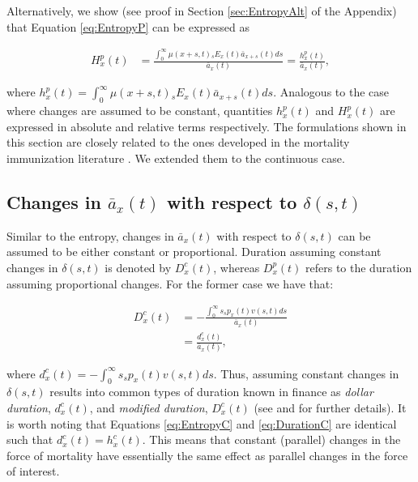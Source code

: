 \documentclass[12pt]{article}
\begin{document}
Alternatively, we show (see proof in Section \ref{sec:EntropyAlt} of the Appendix) that Equation \ref{eq:EntropyP} can be expressed as

\begin{equation} \label{eq:EntropyP2}
\begin{split}
{H}^{p}_{x}(t) &=  \frac{\int_0^\infty \mu(x+s,t)   {}_sE_x(t) \bar{a}_{x+s}(t) ds}{\bar{a}_x(t)} =  \frac{{h}^{p}_{x}(t)}{\bar{a}_x(t)}, 
\end{split}
\end{equation}

where ${h}^{p}_{x}(t)=\int_0^\infty \mu(x+s,t)   {}_sE_x(t) \bar{a}_{x+s}(t) ds$. Analogous to the case where changes are assumed to be constant, quantities ${h}^{p}_{x}(t)$ and ${H}^{p}_{x}(t)$ are expressed in absolute and relative terms respectively. The formulations shown in this section are closely related to the ones developed in the mortality immunization literature \citep{Tsai2013a,Lin2020}. We extended them to the continuous case.

 
 

\subsection{Changes in $\bar{a}_x(t)$ with respect to $\delta(s,t)$}

 Similar to the entropy, changes in $\bar{a}_x(t)$ with respect to $\delta(s,t)$ can be assumed to be either constant or proportional. Duration assuming constant changes in $\delta(s,t)$ is denoted by ${D}^{c}_{x}(t)$, whereas ${D}^{p}_{x}(t)$ refers to the duration assuming proportional changes. For the former case we have that:



\begin{equation}\label{eq:DurationC}
\begin{split}
{D}^{c}_x(t)&= -\frac{\int_0^\infty s {}_sp_x(t) {v}(s,t)ds}{\bar{a}_x(t)} \\
&= \frac{{d}^{c}_x(t)}{\bar{a}_x(t)},
\end{split}
\end{equation}

where ${d}^{c}_x(t)=-\int_0^\infty s {}_sp_x(t) {v}(s,t)ds$. Thus, assuming constant changes in $\delta(s,t)$ results into common types of duration known in finance as \textit{dollar duration}, ${d}^{c}_x(t)$, and \textit{modified duration}, ${D}^{c}_x(t)$ (see \citet{Milevsky2012} and \citet{Tsai2013a} for further details). It is worth noting that Equations \ref{eq:EntropyC} and \ref{eq:DurationC} are identical such that ${d}^{c}_x(t)={h}^{c}_{x}(t)$. This means that constant (parallel) changes in the force of mortality have essentially the same effect as parallel changes in the force of interest.
\end{document}

